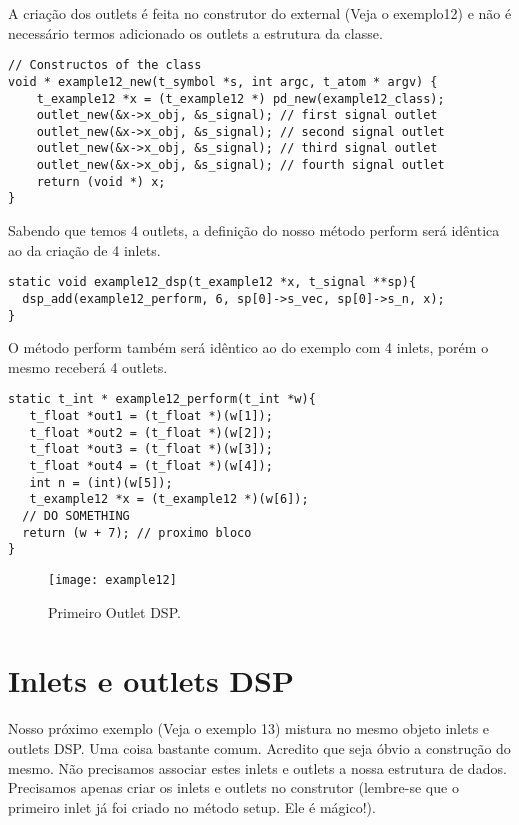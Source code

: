 A criação dos outlets é feita no construtor do external (Veja o exemplo12) e
não é necessário termos adicionado os outlets a estrutura da classe.

\begin{lstlisting}
// Constructos of the class
void * example12_new(t_symbol *s, int argc, t_atom * argv) {
    t_example12 *x = (t_example12 *) pd_new(example12_class);
    outlet_new(&x->x_obj, &s_signal); // first signal outlet
    outlet_new(&x->x_obj, &s_signal); // second signal outlet
    outlet_new(&x->x_obj, &s_signal); // third signal outlet
    outlet_new(&x->x_obj, &s_signal); // fourth signal outlet
    return (void *) x;
}
\end{lstlisting}

Sabendo que temos 4 outlets, a definição do nosso método perform será idêntica
ao da criação de 4 inlets.

\begin{lstlisting}
static void example12_dsp(t_example12 *x, t_signal **sp){
  dsp_add(example12_perform, 6, sp[0]->s_vec, sp[0]->s_n, x);
}
\end{lstlisting}

O método perform também será idêntico ao do exemplo com 4 inlets, porém o mesmo
receberá 4 outlets.

\begin{lstlisting}
static t_int * example12_perform(t_int *w){
   t_float *out1 = (t_float *)(w[1]);
   t_float *out2 = (t_float *)(w[2]);
   t_float *out3 = (t_float *)(w[3]);
   t_float *out4 = (t_float *)(w[4]);
   int n = (int)(w[5]);
   t_example12 *x = (t_example12 *)(w[6]);
  // DO SOMETHING
  return (w + 7); // proximo bloco
}
\end{lstlisting}

\begin{figure}[h!]
	\centering
	\texttt{[image: example12]}
	\caption{Primeiro Outlet DSP.}
\end{figure}

\section{Inlets e outlets DSP}
Nosso próximo exemplo (Veja o exemplo 13) mistura no mesmo objeto inlets e
outlets DSP. Uma coisa bastante comum. Acredito que seja óbvio a construção do
mesmo. Não precisamos associar estes inlets e outlets a nossa estrutura de
dados. Precisamos apenas criar os inlets e outlets no construtor (lembre-se que
o primeiro inlet já foi criado no método setup. Ele é mágico!).

